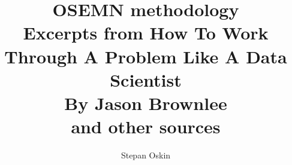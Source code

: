 \documentclass[11pt]{article}
\begin{document}
    \title{OSEMN methodology\\
    Excerpts from How To Work Through A Problem Like A Data Scientist \\
    By Jason Brownlee\cite{Brownlee2014} \\
    and other sources}


    \author{Stepan Oskin}

    \maketitle

    
    
\end{document}
